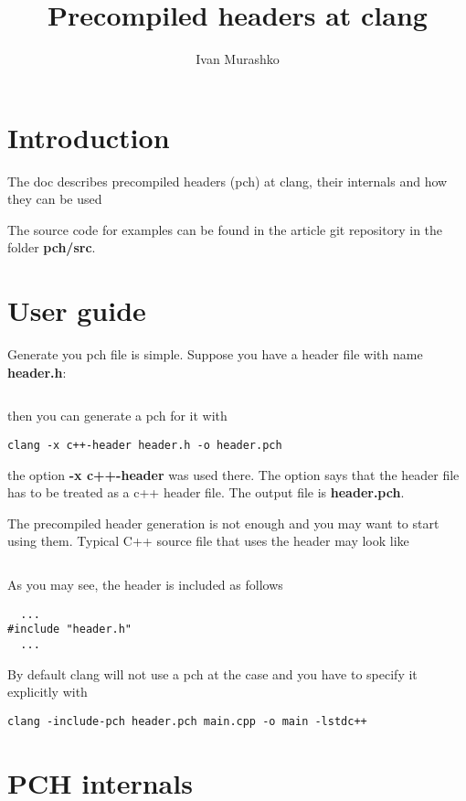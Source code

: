 \documentclass[14pt,a4paper]{article}
\title{Precompiled headers at clang}
\author{Ivan Murashko}
\date{}
\begin{document}
\maketitle
\tableofcontents

\section*{Introduction}
The doc describes precompiled headers (pch) at clang, their internals and
how they can be used

The source code for examples can be found in the article git
repository \cite{github:articles_ivanmurashko} in the folder 
\textbf{pch/src}.

\section{User guide}
Generate you pch file is simple. Suppose you have a header file with
name \textbf{header.h}:
\inputminted{c++}{./src/simple/header.h} then you can generate a pch for it with
\begin{verbatim}
clang -x c++-header header.h -o header.pch
\end{verbatim}
the option \textbf{-x c++-header} was used there. The option says that
the header file has to be treated as a c++ header file. The output
file is \textbf{header.pch}.

The precompiled header generation is not enough and you may want to
start using them. Typical C++ source file that uses the header may
look like
\inputminted{c++}{./src/simple/main.cpp}
As you may see, the header is included as follows
\begin{verbatim}
  ...
#include "header.h"
  ...
\end{verbatim}
By default clang will not use a pch at the case and you have to
specify it explicitly with
\begin{verbatim}
clang -include-pch header.pch main.cpp -o main -lstdc++
\end{verbatim}


\section{PCH internals}

  
     
\end{document}
